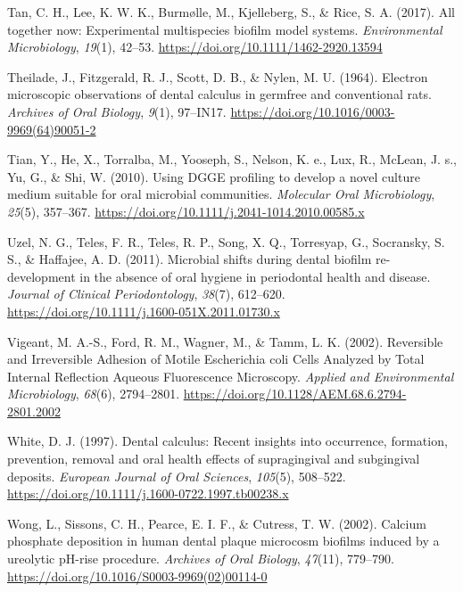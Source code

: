 \documentclass[
  letterpaper,
]{book}
\newlength{\cslhangindent}
\newlength{\cslentryspacingunit} %
\newenvironment{CSLReferences}[2] %
 {%
  \setlength{\parindent}{0pt}
  \ifodd #1
  \let\oldpar\par
  \def\par{\hangindent=\cslhangindent\oldpar}
  \fi
  \setlength{\parskip}{#2\cslentryspacingunit}
 }%
 {}
\begin{document}
\begin{CSLReferences}{1}{0}
\leavevmode{}%
Tan, C. H., Lee, K. W. K., Burmølle, M., Kjelleberg, S., \& Rice, S. A.
(2017). All together now: Experimental multispecies biofilm model
systems. \emph{Environmental Microbiology}, \emph{19}(1), 42--53.
\url{https://doi.org/10.1111/1462-2920.13594}

\leavevmode{}%
Theilade, J., Fitzgerald, R. J., Scott, D. B., \& Nylen, M. U. (1964).
Electron microscopic observations of dental calculus in germfree and
conventional rats. \emph{Archives of Oral Biology}, \emph{9}(1),
97--IN17. \url{https://doi.org/10.1016/0003-9969(64)90051-2}

\leavevmode{}%
Tian, Y., He, X., Torralba, M., Yooseph, S., Nelson, K. e., Lux, R.,
McLean, J. s., Yu, G., \& Shi, W. (2010). Using {DGGE} profiling to
develop a novel culture medium suitable for oral microbial communities.
\emph{Molecular Oral Microbiology}, \emph{25}(5), 357--367.
\url{https://doi.org/10.1111/j.2041-1014.2010.00585.x}

\leavevmode{}%
Uzel, N. G., Teles, F. R., Teles, R. P., Song, X. Q., Torresyap, G.,
Socransky, S. S., \& Haffajee, A. D. (2011). Microbial shifts during
dental biofilm re-development in the absence of oral hygiene in
periodontal health and disease. \emph{Journal of Clinical
Periodontology}, \emph{38}(7), 612--620.
\url{https://doi.org/10.1111/j.1600-051X.2011.01730.x}

\leavevmode{}%
Vigeant, M. A.-S., Ford, R. M., Wagner, M., \& Tamm, L. K. (2002).
Reversible and {Irreversible Adhesion} of {Motile Escherichia} coli
{Cells Analyzed} by {Total Internal Reflection Aqueous Fluorescence
Microscopy}. \emph{Applied and Environmental Microbiology},
\emph{68}(6), 2794--2801.
\url{https://doi.org/10.1128/AEM.68.6.2794-2801.2002}

\leavevmode{}%
White, D. J. (1997). Dental calculus: Recent insights into occurrence,
formation, prevention, removal and oral health effects of supragingival
and subgingival deposits. \emph{European Journal of Oral Sciences},
\emph{105}(5), 508--522.
\url{https://doi.org/10.1111/j.1600-0722.1997.tb00238.x}

\leavevmode{}%
Wong, L., Sissons, C. H., Pearce, E. I. F., \& Cutress, T. W. (2002).
Calcium phosphate deposition in human dental plaque microcosm biofilms
induced by a ureolytic {pH-rise} procedure. \emph{Archives of Oral
Biology}, \emph{47}(11), 779--790.
\url{https://doi.org/10.1016/S0003-9969(02)00114-0}


\end{CSLReferences}
\end{document}
